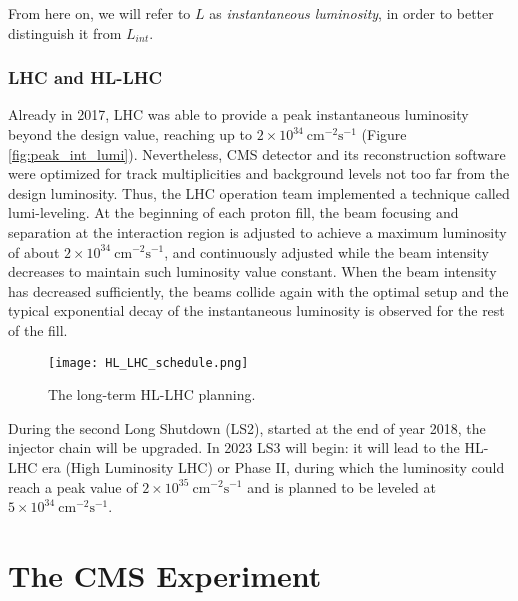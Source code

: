 \documentclass[12pt,twoside,a4paper]{report}
\numberwithin{equation}{section}
\begin{document}
From here on, we will refer to $L$ as \textit{instantaneous luminosity}, in order to better distinguish it from $L_{int}$.

\subsection{LHC and HL-LHC}
Already in 2017, LHC was able to provide a peak instantaneous luminosity beyond the design value, reaching up to $2 \times 10^{34}\ \mathrm{cm^{-2}s^{-1}}$ (Figure \ref{fig:peak_int_lumi}).
Nevertheless, CMS detector and its reconstruction software were optimized for track multiplicities and background levels not too far from the design luminosity. Thus, the LHC operation team implemented a technique called lumi-leveling. At the beginning of each proton fill, the beam focusing and separation at the interaction region is adjusted to achieve a maximum luminosity of about $2 \times 10^{34}\ \mathrm{cm^{-2}s^{-1}}$, and continuously adjusted while the beam intensity decreases to maintain such luminosity value constant. When the beam intensity has decreased sufficiently, the beams collide again with the optimal setup and the typical exponential decay of the instantaneous luminosity is observed for the rest of the fill.
\begin{figure}[!htb]
\texttt{[image: HL\_LHC\_schedule.png]}
\caption{\label{fig:hl_planning} The long-term HL-LHC planning. \cite{hi_lumi}}
\end{figure}
During the second Long Shutdown (LS2), started at the end of year 2018, the injector chain will be upgraded. In 2023 LS3 will begin: it will lead to the HL-LHC era (High Luminosity LHC) or Phase II, during which the luminosity could reach a peak value of $2 \times 10^{35}\ \mathrm{cm^{-2}s^{-1}}$ and is planned to be leveled at $5 \times 10^{34}\ \mathrm{cm^{-2}s^{-1}}$.

\newpage
\chapter{The CMS Experiment}
\label{ch:CMS}
\end{document}
